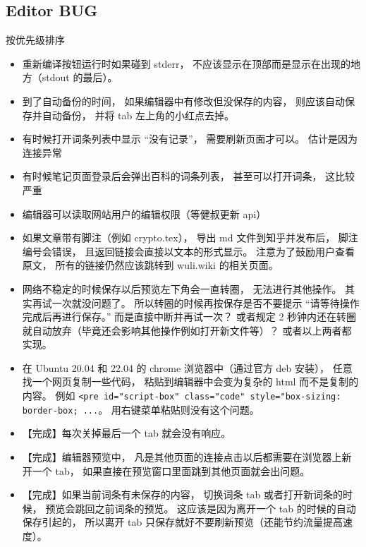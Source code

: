 \subsection{Editor BUG}
按优先级排序
\begin{itemize}
\item 重新编译按钮运行时如果碰到 stderr， 不应该显示在顶部而是显示在出现的地方（stdout 的最后）。

\item 到了自动备份的时间， 如果编辑器中有修改但没保存的内容， 则应该自动保存并自动备份， 并将 tab 左上角的小红点去掉。

\item 有时候打开词条列表中显示 “没有记录”， 需要刷新页面才可以。 估计是因为连接异常

\item 有时候笔记页面登录后会弹出百科的词条列表， 甚至可以打开词条， 这比较严重

\item 编辑器可以读取网站用户的编辑权限（等健叔更新 api）

\item 如果文章带有脚注（例如 crypto.tex）， 导出 md 文件到知乎并发布后， 脚注编号会错误， 且返回链接会直接以文本的形式显示。 注意为了鼓励用户查看原文， 所有的链接仍然应该跳转到 wuli.wiki 的相关页面。

\item 网络不稳定的时候保存以后预览左下角会一直转圈， 无法进行其他操作。 其实再试一次就没问题了。 所以转圈的时候再按保存是否不要提示 “请等待操作完成后再进行保存。” 而是直接中断并再试一次？ 或者规定 2 秒钟内还在转圈就自动放弃（毕竟还会影响其他操作例如打开新文件等）？ 或者以上两者都实现。

\item 在 Ubuntu 20.04 和 22.04 的 chrome 浏览器中（通过官方 deb 安装）， 任意找一个网页复制一些代码， 粘贴到编辑器中会变为复杂的 html 而不是复制的内容。 例如 \verb|<pre id="script-box" class="code" style="box-sizing: border-box; ...|。 用右键菜单粘贴则没有这个问题。

\item 【完成】每次关掉最后一个 tab 就会没有响应。

\item 【完成】编辑器预览中， 凡是其他页面的连接点击以后都需要在浏览器上新开一个 tab， 如果直接在预览窗口里面跳到其他页面就会出问题。

\item 【完成】如果当前词条有未保存的内容， 切换词条 tab 或者打开新词条的时候， 预览会跳回之前词条的预览。 这应该是因为离开一个 tab 的时候的自动保存引起的， 所以离开 tab 只保存就好不要刷新预览（还能节约流量提高速度）。


\end{itemize}

